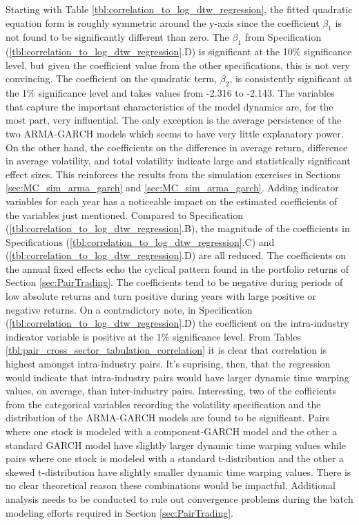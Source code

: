 \documentclass[12pt]{report}
\begin{document}
Starting with Table \ref{tbl:correlation_to_log_dtw_regression}, the fitted quadratic equation form is roughly symmetric around the y-axis since the coefficient $\beta_{1}$ is not found to be significantly different than zero. The $\beta_{1}$ from Specification (\ref{tbl:correlation_to_log_dtw_regression}.D) is significant at the 10\% significance level, but given the coefficient value from the other specifications, this is not very convincing. The coefficient on the quadratic term, $\beta_{2}$, is consistently significant at the 1\% significance level and takes values from -2.316 to -2.143. The variables that capture the important characteristics of the model dynamics are, for the most part, very influential. The only exception is the average persistence of the two ARMA-GARCH models which seems to have very little explanatory power. On the other hand, the coefficients on the difference in average return, difference in average volatility, and total volatility indicate large and statistically significant effect sizes. This reinforces the results from the simulation exercises in Sections \ref{sec:MC_sim_arma_garch} and \ref{sec:MC_sim_arma_garch}. Adding indicator variables for each year has a noticeable impact on the estimated coefficients of the variables just mentioned. Compared to Specification (\ref{tbl:correlation_to_log_dtw_regression}.B), the magnitude of the coefficients in Specifications (\ref{tbl:correlation_to_log_dtw_regression}.C) and (\ref{tbl:correlation_to_log_dtw_regression}.D) are all reduced. The coefficients on the annual fixed effects echo the cyclical pattern found in the portfolio returns of Section \ref{sec:PairTrading}. The coefficients tend to be negative during periods of low absolute returns and turn positive during years with large positive or negative returns. On a contradictory note, in Specification (\ref{tbl:correlation_to_log_dtw_regression}.D) the coefficient on the intra-industry indicator variable is positive at the 1\% significance level. From Tables \ref{tbl:pair_cross_sector_tabulation_correlation} it is clear that correlation is highest amongst intra-industry pairs. It's suprising, then, that the regression would indicate that intra-industry pairs would have larger dynamic time warping values, on average, than inter-industry pairs. Interesting, two of the cofficients from the categorical variables recording the volatility specification and the distribution of the ARMA-GARCH models are found to be significant. Pairs where one stock is modeled with a component-GARCH model and the other a standard GARCH model have slightly larger dynamic time warping values while pairs where one stock is modeled with a standard t-distribution and the other a skewed t-distribution have slightly smaller dynamic time warping values. There is no clear theoretical reason these combinations would be impactful. Additional analysis needs to be conducted to rule out convergence problems during the batch modeling efforts required in Section \ref{sec:PairTrading}.
\end{document}
